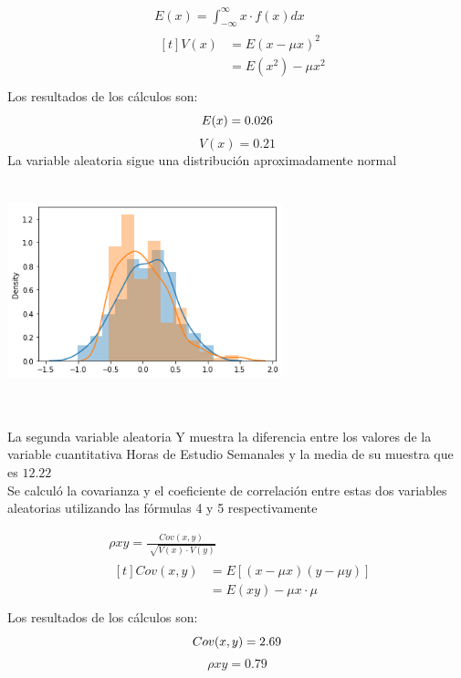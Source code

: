 \documentclass[12pt]{article}
\begin{document}
\begin{align}
    & E(x) = \int_{-\infty}^{\infty} x\cdot f(x)dx\\
    & \begin{aligned}[t]
               V(x) &= E(x-\mu x)^{2}\\
                &= E(x^{2}) - \mu x^{2}\\
       \end{aligned}
\end{align}
Los resultados de los cálculos son:
\begin{equation*}
   E(x) = 0.026\\
\end{equation*}
\begin{equation*}
   V(x) = 0.21
\end{equation*}
La variable aleatoria sigue una distribución aproximadamente normal\\
\includegraphics[width=8cm, height=7cm]{normal}

La segunda variable aleatoria Y muestra la diferencia entre los valores de la variable cuantitativa Horas de Estudio Semanales y la media de su muestra que es $12.22$\\
Se calculó la covarianza y el coeficiente de correlación entre estas dos variables aleatorias utilizando las fórmulas 4 y 5 respectivamente

\begin{align}
    & \rho xy = \frac{Cov(x,y)}{\sqrt[]{V(x)\cdot V(y)}}\\
    & \begin{aligned}[t]
	Cov(x,y) &=  E[(x-\mu x)(y-\mu y)]\\
        	&=  E(xy) - \mu x\cdot \mu \\ 
       \end{aligned}
\end{align}
Los resultados de los cálculos son:
\begin{equation*}
   Cov(x,y)= 2.69\\
\end{equation*}
\begin{equation*}
   \rho xy  = 0.79
\end{equation*}
\end{document}
